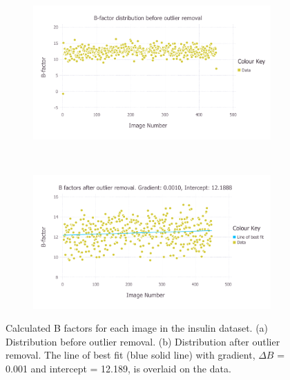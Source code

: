 \begin{figure}
    \centering
    \begin{subfigure}[b]{1.0\textwidth}
            \centering
            \includegraphics[width=\textwidth]{figures/datared/BFac_Plot_Before_outlier_removal.pdf}
            \caption{}
            \label{fig:B factors per image before outlier removal - insulin}
    \end{subfigure}
    \\
    \begin{subfigure}[b]{1.0\textwidth}
            \centering
            \includegraphics[width=\textwidth]{figures/datared/BFac_Plot_After_outlier_removal.pdf}
            \caption{}
            \label{fig:B factors per image after outlier removal - insulin}
    \end{subfigure}
    \caption{Calculated B factors for each image in the insulin dataset.
    (a) Distribution before outlier removal.
    (b) Distribution after outlier removal.
    The line of best fit (blue solid line) with gradient, $\Delta B$ = 0.001 and intercept = 12.189, is overlaid on the data.}
    \label{fig:B factors per image - insulin}
\end{figure}

